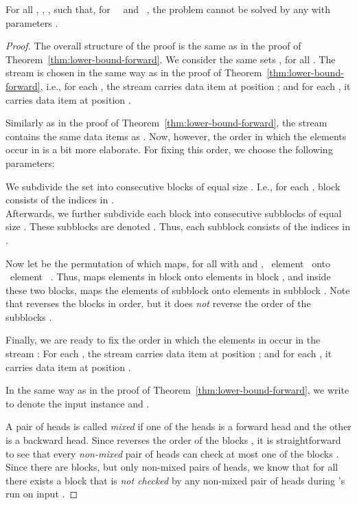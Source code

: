 \documentclass[proceedings]{stacs}
\theoremstyle{plain}\newtheorem{satz}[thm]{Satz}
\theoremstyle{definition}\newtheorem{crucial}[thm]{Crucial Definition}
\newcommand{\aut}{\text{mp2s-automaton}}
\begin{document}
\begin{theorem}\label{thm:lower-bound-general}
 For all , , ,  such that,
 for \  \ and  \ ,
 the problem  cannot be solved 
 by any \aut{} with parameters .
\end{theorem}
\begin{proof}
The overall structure of the proof is the same as in the proof of
Theorem~\ref{thm:lower-bound-forward}.
We consider the same sets , for all .
The stream  is chosen in the same way as in the proof of
Theorem~\ref{thm:lower-bound-forward}, i.e., 
for each , the stream  carries  
data item  at position ; and for each , it carries data item  at
position .

Similarly as in the proof of Theorem~\ref{thm:lower-bound-forward}, the
stream  contains the same data items as . Now, however, the
order in which the elements occur in  is a bit more elaborate.
For fixing this order, we choose the following parameters: \vspace{1ex}

We subdivide the set
 into  consecutive blocks  of equal size 
. I.e., for each , block  consists of the
indices in .
\\
Afterwards, we further subdivide each block  into  consecutive subblocks of 
equal size . These subblocks are denoted .
Thus, each subblock  consists of the indices in  
.

Now let  be the permutation of  which maps, for all  with
 and , \ element 
 \ onto \ element \ 
.
Thus,  maps elements in block  onto elements in block , and
inside these two blocks,  maps the elements of subblock  onto
elements in subblock . 
Note that  reverses the blocks  in order, but it does \emph{not} reverse the 
order of the subblocks .

Finally, we are ready to fix the order in which the elements in  occur in the
stream : For each , the stream  carries
data item  at position ; and for each , it carries
data item  at position .

In the same way as in the proof of Theorem~\ref{thm:lower-bound-forward}, we
write  to denote the input instance  and .

A pair of heads  is called \emph{mixed} if one of the heads is a
forward head and the other is a backward head.
Since  reverses the order of the blocks , 
it is straightforward to see that every \emph{non-mixed} pair of heads can
check at most one of the blocks . Since there are
 blocks, but only  non-mixed pairs of heads, we know that for
all  there exists a block  that is 
\emph{not checked} by any non-mixed pair of heads during 's run on input
.


\end{proof}
\end{document}
